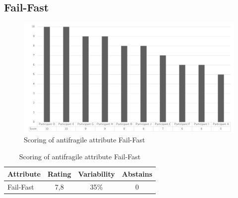 \subsection{Fail-Fast}
\begin{figure}[h!]
	\centering
	\includegraphics[width=0.9\linewidth]{images/scoreaffailfast}
	\caption[Scoring of antifragile attribute Fail-Fast]{Scoring of antifragile attribute Fail-Fast}
	\label{fig:appscoringaffailfast}
\end{figure}
\begin{table}[h!]
	\centering
	\begin{tabular}{p{}ccc}
		\toprule
		\textbf{Attribute} & \textbf{Rating} & \textbf{Variability} & \textbf{Abstains} \\
		\midrule
		Fail-Fast & 7,8 & 35\% & 0 \\%
		\bottomrule
	\end{tabular}%
	\caption[Scoring of antifragile attribute Fail-Fast]{Scoring of antifragile attribute Fail-Fast}
	\label{tab:appscoringaffailfast}%
\end{table}%
\newpage
